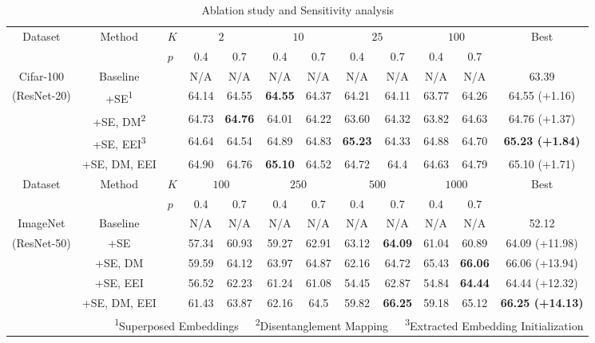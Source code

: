 \documentclass{article}
\begin{document}
\begin{table}[]
\centering
\scriptsize
\caption{Ablation study and Sensitivity analysis}
    \label{tab:ab}    
    \resizebox{\textwidth}{!}
    {
    \begin{tabular}{ccp{0.5mm}ccccccccc}
    \toprule
    \multirow{2}{*}{Dataset} & 
    \multirow{2}{*}{Method} & $K$ &  
    \multicolumn{2}{c}{$2$} &  
    \multicolumn{2}{c}{$10$} &  
    \multicolumn{2}{c}{$25$} &  
    \multicolumn{2}{c}{$100$} & 
    \multirow{2}{*}{Best} \\
\cmidrule(lr){4-5}
    \cmidrule(lr){6-7}
    \cmidrule(lr){8-9}
    \cmidrule(lr){10-11}
    &&$p$ & 0.4 & 0.7 &  0.4 & 0.7 &  0.4 & 0.7 &  0.4 & 0.7  &\\
    \midrule
Cifar-100&Baseline&&N/A&N/A&N/A&N/A&N/A&N/A&N/A&N/A&63.39\\
(ResNet-20)&+SE\textsuperscript{1}&&64.14&64.55&\textbf{64.55}&64.37&64.21&64.11&63.77&64.26&64.55 (+1.16)\\
&+SE, DM\textsuperscript{2}&&64.73&\textbf{64.76}&64.01&64.22&63.60&64.32&63.82&64.63&64.76 (+1.37)\\
&+SE, EEI\textsuperscript{3}&&64.64&64.54&64.89&64.83&\textbf{65.23}&64.33&64.88&64.70&\textbf{65.23 (+1.84)}\\
&+SE, DM, EEI&&64.90&64.76&\textbf{65.10}&64.52&64.72&64.4&64.63&64.79&65.10 (+1.71)\\
                               
\midrule 
        \multirow{2}{*}{Dataset} & \multirow{2}{*}{Method} & $K$ & 
    \multicolumn{2}{c}{$100$} &  
    \multicolumn{2}{c}{$250$} &  
    \multicolumn{2}{c}{$500$} &  
    \multicolumn{2}{c}{$1000$} & 
    \multirow{2}{*}{Best} \\
\cmidrule(lr){4-5}
    \cmidrule(lr){6-7}
    \cmidrule(lr){8-9}
    \cmidrule(lr){10-11}
    

    &&$p$ & 0.4 & 0.7 &  0.4 & 0.7 &  0.4 & 0.7 &  0.4 & 0.7  &\\
    \midrule
ImageNet&Baseline&&N/A&N/A&N/A&N/A&N/A&N/A&N/A&N/A&52.12\\

(ResNet-50)&+SE&& 57.34 & 60.93& 59.27& 62.91& 63.12& \textbf{64.09} & 61.04& 60.89 & 64.09 (+11.98)\\
&+SE, DM&&59.59&64.12&63.97&64.87&62.16&64.72& 65.43& \textbf{66.06} & 66.06 (+13.94)\\
&+SE, EEI&& 56.52& 62.23& 61.24& 61.08& 54.45& 62.87& 54.84& \textbf{64.44} & 64.44 (+12.32)\\
&+SE, DM, EEI&&61.43&63.87&62.16&64.5&59.82&\textbf{66.25}&59.18&65.12&\textbf{66.25 (+14.13)}\\

    \bottomrule
              \multicolumn{12}{r}{\tiny\textsuperscript{1}Superposed Embeddings\ \ \ \tiny\textsuperscript{2}Disentanglement Mapping\ \ \ \tiny\textsuperscript{3}Extracted Embedding Initialization} \\
    \end{tabular}
    }

\end{table}
\end{document}

